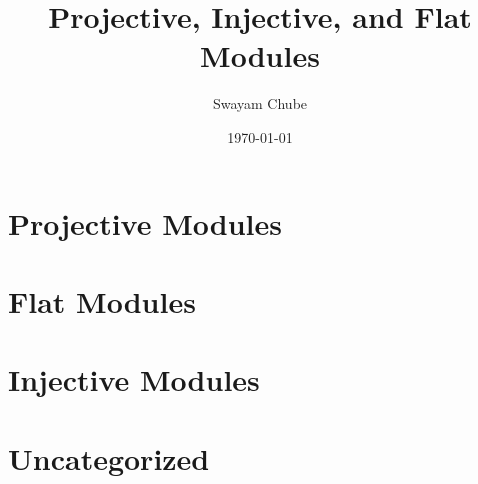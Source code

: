 \documentclass[11pt]{article}
\title{Projective, Injective, and Flat Modules}
\author{Swayam Chube}
\date{\today}
\theoremstyle{thmstyle}
\theoremstyle{defstyle}
\begin{document}
\maketitle

\tableofcontents

\section{Projective Modules}


\section{Flat Modules}


\section{Injective Modules}


\section{Uncategorized}


\end{document}
